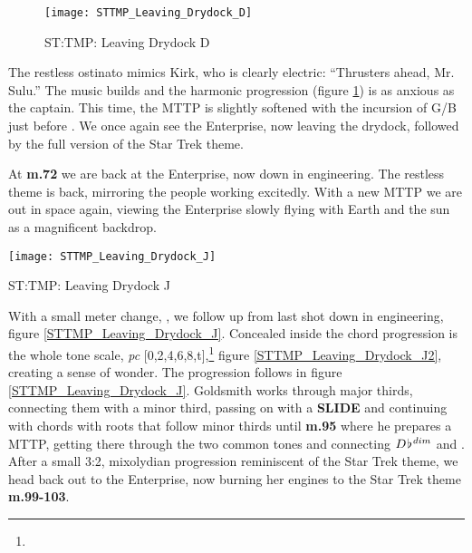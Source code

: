 \begin{figure}
\center
\texttt{[image: STTMP\_Leaving\_Drydock\_D]}
	\caption{ST:TMP: Leaving Drydock D}
	\label{STTMP_Leaving_Drydock_D}
\end{figure}
The restless ostinato mimics Kirk, who is clearly electric: ``Thrusters ahead, Mr. Sulu.'' The music builds and the harmonic progression (figure \ref{STTMP_Leaving_Drydock_D}) is as anxious as the captain. This time, the \ac{MTTP} is slightly softened with the incursion of G/B just before \bflat. We once again see the Enterprise, now leaving the drydock, followed by the full version of the Star Trek theme. 

At \textbf{m.72} we are back at the Enterprise, now down in engineering. The restless theme is back, mirroring the people working excitedly. With a new \ac{MTTP} we are out in space again, viewing the Enterprise slowly flying with Earth and the sun as a magnificent backdrop.

\begin{marginfigure}[-10cm]
\texttt{[image: STTMP\_Leaving\_Drydock\_J]}
	\caption{ST:TMP: Leaving Drydock J}
	\label{STTMP_Leaving_Drydock_J}
\end{marginfigure}

With a small meter change, , we follow up from last shot down in engineering, figure \ref{STTMP_Leaving_Drydock_J}. Concealed inside the chord progression is the whole tone scale, \textit{pc} [0,2,4,6,8,t],\footnote{} figure \ref{STTMP_Leaving_Drydock_J2}, creating a sense of wonder. The progression follows in figure \ref{STTMP_Leaving_Drydock_J}. Goldsmith works through major thirds, connecting them with a minor third, passing on with a \textbf{SLIDE} and continuing with chords with roots that follow minor thirds until \textbf{m.95} where he prepares a \ac{MTTP}, getting there through the two common tones \fiss and \aiss connecting \(D\hspace*{0.18ex}\flat\hspace*{0.18ex}^{dim}\) and \fiss. After a small 3:2, mixolydian progression reminiscent of the Star Trek theme, we head back out to the Enterprise, now burning her engines to the Star Trek theme \textbf{m.99-103}.

